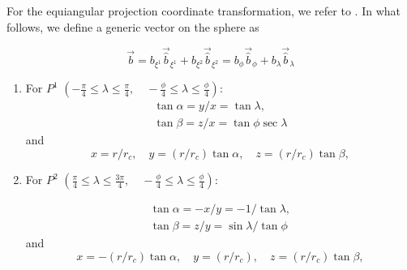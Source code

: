 \documentclass{report}
\begin{document}
For the equiangular projection coordinate transformation, we refer to \citep{Ronchi1996}. In what follows, we define a generic vector on the sphere as 

\[
    \vec{b} = b_{\xi^1} \vec{\widehat{b}}_{\xi^1} +  b_{\xi^2} \vec{ \widehat{b}}_{\xi^2} = b_{\phi} \vec{\widehat{b}}_{\phi} + b_{\lambda} \vec{\widehat{b}}_{\lambda}
\]

\begin{enumerate}
\item For $P^1$ $\left(-\frac{\pi}{4} \leq \lambda \leq  \frac{\pi}{4}, \quad -\frac{\phi}{4} \leq \lambda \leq  \frac{\phi}{4} \right)$: 
\begin{equation}
  \begin{array}{l}
        \tan\alpha = y/x = \tan \lambda,\\
        \tan\beta = z/x =\tan \phi \sec \lambda 
  \end{array}
\end{equation}
and
\begin{equation}
 x = r/r_c,  \quad
        y = (r/r_c) \tan\alpha, \quad
        z = (r/r_c) \tan\beta,
\end{equation}

\item For $P^2$ $\left(\frac{\pi}{4} \leq \lambda \leq  \frac{3\pi}{4}, \quad -\frac{\phi}{4} \leq \lambda \leq  \frac{\phi}{4} \right)$:

\begin{equation}
  \begin{array}{l}
        \tan\alpha = -x/y = -1 / \tan \lambda,\\
        \tan\beta =  z/y =  \sin \lambda / \tan \phi 
  \end{array}
\end{equation}
and
\begin{equation}
            x = -(r/r_c) \tan\alpha , \quad
        y = (r/r_c),\quad
        z = (r/r_c) \tan\beta,
\end{equation}


\end{enumerate}
\end{document}
